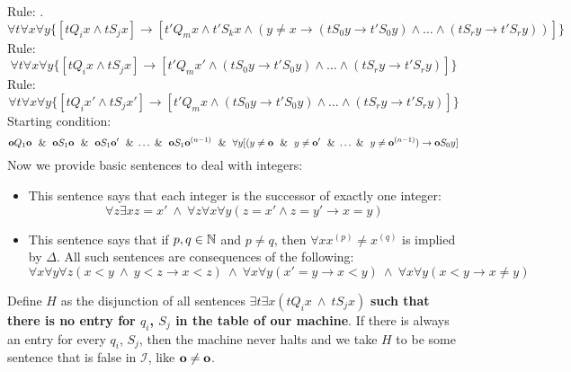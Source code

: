 \noindent Rule: .
\begin{equation}\label{writeTapeEdge}
\forall t\forall x\forall y \{[tQ_ix\land  tS_jx] \rightarrow [t'Q_mx\land  t'S_kx \land  (y\ne x \rightarrow (tS_0y\rightarrow t'S_0y)\land \dots\land (tS_ry\rightarrow t'S_ry))]\}
\end{equation}
Rule: 
\begin{equation}
\forall t\forall x\forall y\{[tQ_ix\land tS_jx]\rightarrow [t'Q_mx' \land  (tS_0y\rightarrow t'S_0y)\land \dots\land (tS_ry\rightarrow t'S_ry)]\}
\end{equation}
Rule: 
\begin{equation}
\forall t \forall x \forall y \{[tQ_ix' \land  tS_jx']\rightarrow [t'Q_mx\land  (tS_0y\rightarrow t'S_0y)\land \dots\land (tS_ry\rightarrow t'S_ry)]\}
\end{equation}
Starting condition:
\begin{equation}
\label{descOfZero}
\mathbf{o} Q_1 \mathbf{o}\ ~\&~ \ \mathbf{o} S_1\mathbf{o}\ ~\&~ \ \mathbf{o} S_1\mathbf{o} '\ ~\&~ \dots~\&~ \ \mathbf{o} S_1\mathbf{o}^{(n-1)}\ ~\&~ \ \forall y [(y\ne \mathbf{o}\ ~\&~ \ y\ne \mathbf{o}'\ ~\&~ \dots~\&~ \ y\ne \mathbf{o}^{(n-1)}) \rightarrow \mathbf{o} S_0y]
\end{equation}
Now we provide basic sentences to deal with integers:
\begin{itemize}
\item This sentence says that each integer is the successor of exactly one integer:
\begin{equation}\label{successorOfOneOther}
\forall z\exists x z = x'\ \land  \ \forall z\forall x\forall y (z=x'\land z=y'\rightarrow x=y)
\end{equation}
\item This sentence says that if $p,q\in\mathbb{N}$ and $p\ne q$, then $\forall x x^{(p)}\ne x^{(q)}$ is implied by $\Delta$. All such sentences are consequences of the following:
\begin{equation}\label{additionWorks}
\forall x\forall y\forall z (x < y\ \land \ y < z\rightarrow x<z)\ \land \ \forall x\forall y(x'=y\rightarrow x<y)\ \land \ \forall x\forall y(x<y\rightarrow x\ne y)
\end{equation}
\end{itemize}

Define $H$ as the disjunction of all sentences $\exists t\exists x (tQ_i x\ \land \ tS_jx)$ \textbf{such that there is no entry for $q_i$, $S_j$ in the table of our machine}. If there is always an entry for every $q_i$, $S_j$, then the machine never halts and we take $H$ to be some sentence that is false in $\mathscr{I}$, like $\mathbf{o}\ne \mathbf{o}$.
